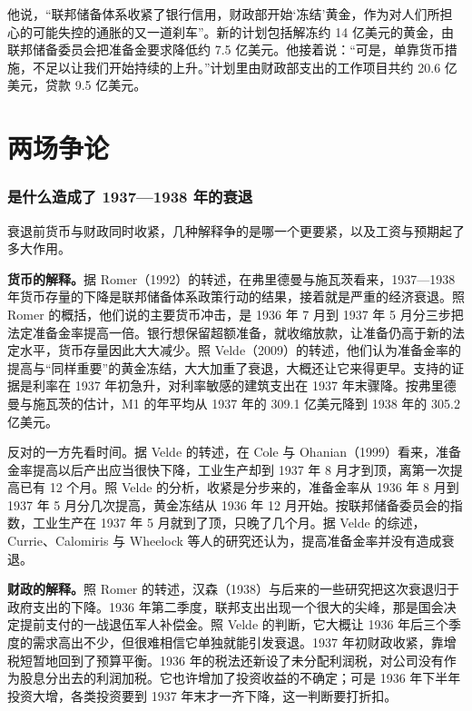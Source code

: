 他说，“联邦储备体系收紧了银行信用，财政部开始‘冻结’黄金，作为对人们所担心的可能失控的通胀的又一道刹车”\cite{app1938}。新的计划包括解冻约 14 亿美元的黄金，由联邦储备委员会把准备金要求降低约 7.5 亿美元\cite{app1938}。他接着说：“可是，单靠货币措施，不足以让我们开始持续的上升。”\cite{app1938}计划里由财政部支出的工作项目共约 20.6 亿美元，贷款 9.5 亿美元\cite{app1938}。

\section{两场争论}\label{sec:islm-debate}

\subsubsection{是什么造成了 1937—1938 年的衰退}
衰退前货币与财政同时收紧，几种解释争的是哪一个更要紧，以及工资与预期起了多大作用。

\textbf{货币的解释。}据 Romer（1992）的转述，在弗里德曼与施瓦茨看来，1937—1938 年货币存量的下降是联邦储备体系政策行动的结果，接着就是严重的经济衰退\cite{romer1992}。照 Romer 的概括，他们说的主要货币冲击，是 1936 年 7 月到 1937 年 5 月分三步把法定准备金率提高一倍。银行想保留超额准备，就收缩放款，让准备仍高于新的法定水平，货币存量因此大大减少\cite{romer1992}。照 Velde（2009）的转述，他们认为准备金率的提高与“同样重要”的黄金冻结，大大加重了衰退，大概还让它来得更早\cite{velde2009}。支持的证据是利率在 1937 年初急升，对利率敏感的建筑支出在 1937 年末骤降\cite{romer1992}。按弗里德曼与施瓦茨的估计，M1 的年平均从 1937 年的 309.1 亿美元降到 1938 年的 305.2 亿美元\cite{census1975x}。

反对的一方先看时间。据 Velde 的转述，在 Cole 与 Ohanian（1999）看来，准备金率提高以后产出应当很快下降，工业生产却到 1937 年 8 月才到顶，离第一次提高已有 12 个月\cite{velde2009}。照 Velde 的分析，收紧是分步来的，准备金率从 1936 年 8 月到 1937 年 5 月分几次提高，黄金冻结从 1936 年 12 月开始\cite{velde2009}。按联邦储备委员会的指数，工业生产在 1937 年 5 月就到了顶，只晚了几个月\cite{velde2009}。据 Velde 的综述，Currie、Calomiris 与 Wheelock 等人的研究还认为，提高准备金率并没有造成衰退\cite{velde2009}。

\textbf{财政的解释。}照 Romer 的转述，汉森（1938）与后来的一些研究把这次衰退归于政府支出的下降\cite{romer1992}。1936 年第二季度，联邦支出出现一个很大的尖峰，那是国会决定提前支付的一战退伍军人补偿金。照 Velde 的判断，它大概让 1936 年后三个季度的需求高出不少，但很难相信它单独就能引发衰退\cite{velde2009}。1937 年初财政收紧，靠增税短暂地回到了预算平衡\cite{velde2009}。1936 年的税法还新设了未分配利润税，对公司没有作为股息分出去的利润加税。它也许增加了投资收益的不确定；可是 1936 年下半年投资大增，各类投资要到 1937 年末才一齐下降，这一判断要打折扣\cite{velde2009}。

